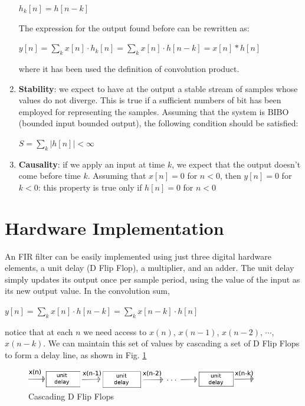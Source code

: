 \begin{enumerate}
    \begin{center}
    	$ h_{k}[n] = h[n-k]  $
    \end{center}
    The expression for the output found before can be rewritten as:
    \begin{center}
    	$ y[n]=\sum\limits_{k}^{ } x[n]\cdot h_{k}[n]= \sum\limits_{k}^{ } x[n]\cdot h[n-k]=x[n]\ast h[n]$
    \end{center}
    where it has been used the definition of convolution product.
    \item \textbf{Stability}: we expect to have at the output a stable stream of samples whose values do not diverge. This is true if a sufficient numbers of bit has been employed for representing the samples. Assuming that the system is BIBO (bounded input bounded output), the following condition should be satisfied: 
    \begin{center}
    	$ S=\sum\limits_{k}^{ } |h[n]| < \infty $
    \end{center}
    \item \textbf{Causality}: if we apply an input at time $ k $,
     we expect that the output doesn't come before time $ k $.
     Assuming that $ x[n] = 0  $ for $ n < 0 $, then $ y[n] = 0 $ for $ k < 0 $: this property is true only if $  h[n] = 0 $ for $ n < 0 $ 
    
\end{enumerate}

\section{Hardware Implementation}
An FIR filter can be easily implemented using just three digital hardware elements, a unit delay (D Flip Flop), a multiplier, and an adder. The unit delay simply updates its output once per sample period, using the value of the input as its new output value. In the convolution sum,

\begin{center}
	$ 	 y[n]=\sum\limits_{k}^{ } x[n]\cdot h[n-k] =\sum\limits_{k}^{ } x[n-k]\cdot h[n]$
\end{center}
notice that at each $ n $ we need access to $ x(n)$, $x(n - 1)$, $x(n - 2)$, $\cdots$, $x(n - k) $. We can maintain this set of values by cascading a set of D Flip Flops to form a delay line, as shown in Fig. \ref{fig:fir1}
\begin{figure}[h!]
	\centering
	\includegraphics[width=0.9\textwidth]{imm/fir/fir1.png}  
	\caption{Cascading D Flip Flops} 
	\label{fig:fir1}
\end{figure}

